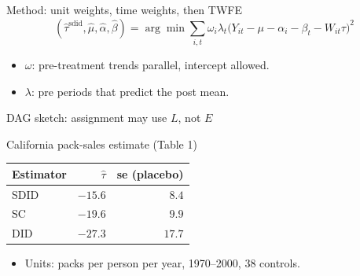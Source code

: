 \documentclass[aspectratio=169,10pt]{beamer}
\begin{document}
\begin{frame}{Method: unit weights, time weights, then TWFE}
  \begin{equation*}
    (\hat\tau^{\mathrm{sdid}},\hat\mu,\hat\alpha,\hat\beta)
    = \arg\min \sum_{i,t}
    \omega_i\lambda_t \bigl(Y_{it}-\mu-\alpha_i-\beta_t-W_{it}\tau\bigr)^{2}
  \end{equation*}
  \begin{itemize}
    \item \(\omega\): pre-treatment trends parallel, intercept allowed.
    \item \(\lambda\): pre periods that predict the post mean.
  \end{itemize}
\end{frame}

\begin{frame}{DAG sketch: assignment may use \(L\), not \(E\)}
\end{frame}

\begin{frame}{California pack-sales estimate (Table 1)}
  \vspace{4pt}
  \begin{tabular}{lrr}
    \toprule
    Estimator & \(\hat\tau\) & se (placebo) \\
    \midrule
    SDID & \(-15.6\) & \(8.4\) \\
    SC   & \(-19.6\) & \(9.9\) \\
    DID  & \(-27.3\) & \(17.7\) \\
    \bottomrule
  \end{tabular}
  \begin{itemize}
    \item Units: packs per person per year, 1970--2000, 38 controls.
  \end{itemize}
\end{frame}
\end{document}
